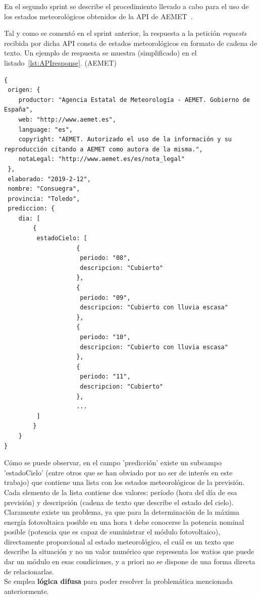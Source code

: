 En el segundo sprint se describe el procedimiento llevado a cabo para el uso de los estados meteorológicos obtenidos de la API de AEMET~\cite{Aemet}.

Tal y como se comentó en el sprint anterior, la respuesta a la petición \textit{requests} recibida por dicha API consta de estados meteorológicos en formato de cadena de texto. Un ejemplo de respuesta se muestra (simplificado) en el listado~\ref{lst:APIresponse}. (\textcopyright AEMET)

\begin{lstlisting}[numbers=none,caption={Ejemplo de respuesta de la API - AEMET},label={lst:APIresponse}]
{
 origen: {
	productor: "Agencia Estatal de Meteorología - AEMET. Gobierno de España",
	web: "http://www.aemet.es",
	language: "es",
	copyright: "AEMET. Autorizado el uso de la información y su reproducción citando a AEMET como autora de la misma.",
	notaLegal: "http://www.aemet.es/es/nota_legal"
 },
 elaborado: "2019-2-12",
 nombre: "Consuegra",
 provincia: "Toledo",
 prediccion: {
 	dia: [
		{
		 estadoCielo: [
					{
					 periodo: "08",
					 descripcion: "Cubierto"
					},
					{
					 periodo: "09",
					 descripcion: "Cubierto con lluvia escasa"
					},
					{
					 periodo: "10",
					 descripcion: "Cubierto con lluvia escasa"
					},
					{
					 periodo: "11",
					 descripcion: "Cubierto"
					},
					...
		 ]
		}
	}
}
\end{lstlisting}

Cómo se puede observar, en el campo 'predicción' existe un subcampo 'estadoCielo' (entre otros que se han obviado por no ser de interés en este trabajo) que contiene una lista con los estados meteorológicos de la previsión. Cada elemento de la lista contiene dos valores: período (hora del día de esa previsión) y descripción (cadena de texto que describe el estado del cielo). Claramente existe un problema, ya que para la determinación de la máxima energía fotovoltaica posible en una hora t debe conocerse la potencia nominal posible (potencia que es capaz de suministrar el módulo fotovoltaico), directamente proporcional al estado meteorológico, el cuál es un texto que describe la situación y no un valor numérico que representa los watios que puede dar un módulo en esas condiciones, y a priori no se dispone de una forma directa de relacionarlas. \\

Se emplea \textbf{lógica difusa} para poder resolver la problemática mencionada anteriormente.
